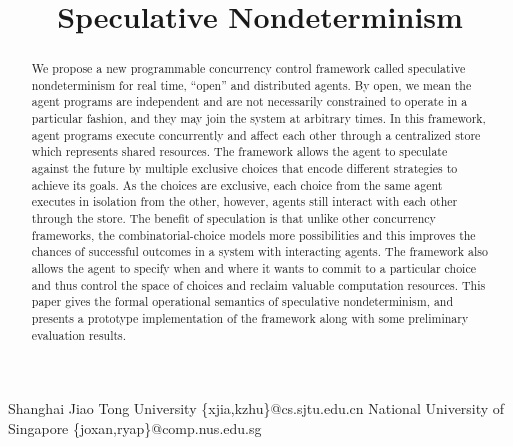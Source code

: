 \documentclass[article,reprint]{sigplanconf}
\begin{document}
\setlength{\abovedisplayskip}{3pt}
\setlength{\belowdisplayskip}{2pt}

\copyrightdata{[to be supplied]}


\title{Speculative Nondeterminism}

           {Shanghai Jiao Tong University}
           {\{xjia,kzhu\}@cs.sjtu.edu.cn}
           {National University of Singapore}
           {\{joxan,ryap\}@comp.nus.edu.sg}

\maketitle

\begin{abstract}
We propose a new programmable concurrency control framework called
speculative nondeterminism for real time,
``open'' and distributed agents. By open, we mean the agent programs
are independent and are not necessarily constrained to operate
in a particular fashion, and they may join the system at arbitrary times.
In this framework,
agent programs execute concurrently and affect each other through
a centralized store which represents shared resources.
The framework allows the agent to speculate against the future by multiple
exclusive choices that encode different strategies to achieve its goals.
As the choices are exclusive, each choice from the same agent
executes in isolation from the other, however,
agents still interact with each other through the store.
The benefit of speculation is that unlike other concurrency frameworks,
the combinatorial-choice models more possibilities and
this improves the chances of successful outcomes in a system with interacting agents.
The framework also allows the agent to specify when and where
it wants to commit to a particular choice
and thus control the space of choices and reclaim valuable computation resources.
This paper gives the formal operational semantics of speculative nondeterminism,
and presents a prototype implementation of the framework along with some
preliminary evaluation results.
\end{abstract}
\end{document}
